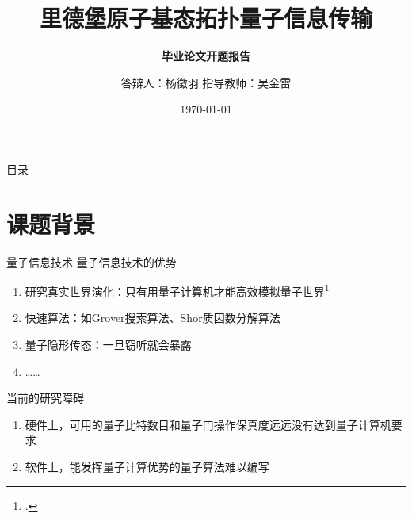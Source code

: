 \documentclass[10pt,aspectratio=43]{beamer}
\title{里德堡原子基态拓扑量子信息传输}
\subtitle{\fontsize{9pt}{14pt}\textbf{毕业论文开题报告}}
\author{答辩人：杨徵羽 \quad 指导教师：吴金雷}
\institute{哈尔滨工业大学(威海)理学院}
\date{\today}
\begin{document}
\frame{\titlepage}

\section[目录]{}   %
\begin{frame}{目录}
\tableofcontents
\end{frame}

\section{课题背景}
\begin{frame}{量子信息技术}
量子信息技术的优势
\begin{enumerate}
\item 研究真实世界演化：只有用量子计算机才能高效模拟量子世界\footcite{1999Simulating}
\item 快速算法：如Grover搜索算法、Shor质因数分解算法
\item 量子隐形传态：一旦窃听就会暴露
\item ……
\end{enumerate}
当前的研究障碍
\begin{enumerate}
\item 硬件上，可用的量子比特数目和量子门操作保真度远远没有达到量子计算机要求
\item 软件上，能发挥量子计算优势的量子算法难以编写
\end{enumerate}
\end{frame}
\end{document}
